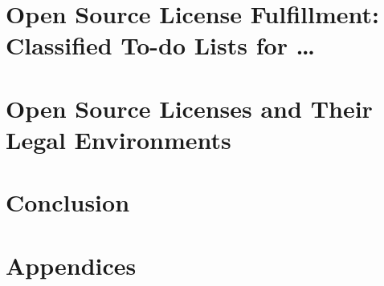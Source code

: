 \documentclass[DIV=calc,BCOR=5mm,12pt,headings=small,oneside,abstract=true,
toc=bib]{scrbook}
\begin{document}
\chapter{Open Source License Fulfillment: Classified To-do Lists for \ldots}







\chapter{Open Source Licenses and Their Legal Environments}



\chapter{Conclusion}



\chapter{Appendices}





\small


\footnotesize


\printnomenclature


\end{document}
